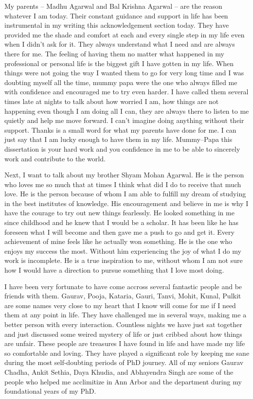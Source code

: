 My parents -- Madhu Agarwal and Bal Krishna Agarwal -- are the reason whatever I
am today. Their constant guidance and support in life has been instrumental in
my writing this acknowledgement section today. They have provided me the shade
and comfort at each and every single step in my life even when I didn't ask for
it. They always understand what I need and are always there for me. The feeling
of having them no matter what happened in my professional or personal life is
the biggest gift I have gotten in my life. When things were not going the way I
wanted them to go for very long time and I was doubting myself all the time,
mummy papa were the one who always filled me with confidence and encouraged me
to try even harder. I have called them several times late at nights to talk about
how worried I am, how things are not happening even though I am doing all I can,
they are always there to listen to me quietly and help me move forward. I can't
imagine doing anything without their support. Thanks is a small word for what my
parents have done for me. I can just say that I am lucky enough to have them in
my life. Mummy--Papa this dissertation is your hard work and you confidence in
me to be able to sincerely work and contribute to the world.

Next, I want to talk about my brother Shyam Mohan Agarwal. He is the person who
loves me so much that at times I think what did I do to receive that much love.
He is the person because of whom I am able to fulfill my dream of studying in
the best institutes of knowledge. His encouragement and believe in me is why I
have the courage to try out new things fearlessly. He looked something in me
since childhood and he knew that I would be a scholar. It has been like he has
foreseen what I will become and then gave me a push to go and get it. Every
achievement of mine feels like he actually won something. He is the one who
enjoys my success the most. Without him experiencing the joy of what I do my
work is incomplete. He is a true inspiration to me, without whom I am not sure
how I would have a direction to pursue something that I love most doing.


I have been very fortunate to have come accross several fantastic people and be
friends with them. Gaurav, Pooja, Kataria, Gauri, Tanvi, Mohit, Kunal, Pulkit
are some names very close to my heart that I know will come for me if I need
them at any point in life. They have challenged me in several ways, making me a
better person with every interaction. Countless nights we have just sat together
and just discussed some weired mystery of life or just cribbed about how things
are unfair. These people are treasures I have found in life and have made my
life so comfortable and loving. They have played a significant role by keeping
me sane during the most self-doubting periods of PhD journey. All of my seniors
Gaurav Chadha, Ankit Sethia, Daya Khudia, and Abhayendra Singh are some of the
people who helped me acclimitize in Ann Arbor and the department during my
foundational years of my PhD. 

